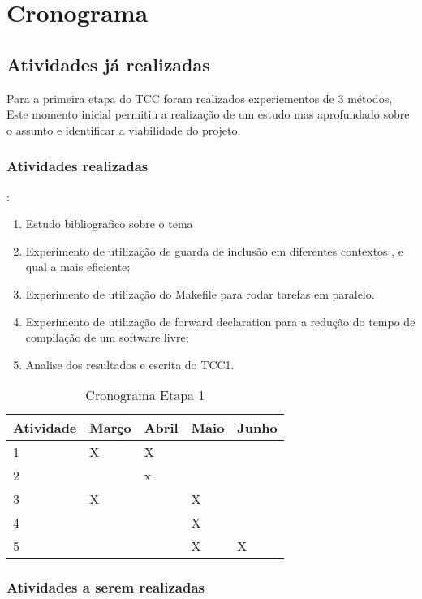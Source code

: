 \chapter[Cronograma]{Cronograma}

\section{Atividades já realizadas}

Para a primeira etapa do TCC foram realizados experiementos de 3 métodos,
 Este momento inicial permitiu a realização de um estudo mas aprofundado
 sobre o assunto e identificar a viabilidade do projeto.


\subsection{Atividades realizadas}:

\begin{enumerate}
	\item		Estudo bibliografico sobre o tema
	\item		Experimento de utilização de guarda de inclusão em diferentes contextos , e qual a mais eficiente;
	\item		Experimento de utilização do Makefile para rodar tarefas em paralelo.
	\item		Experimento de utilização de forward declaration para a redução do tempo de compilação de um software livre;
	\item		Analise dos resultados e escrita do TCC1.
\end{enumerate}

\begin{table}[h]
\centering
\begin{tabular}{|l|l|l|l|l|}
Atividade & Março & Abril & Maio & Junho \\ \hline
1         & X     & X     &      &       \\ \hline
2         &       & x     &      &       \\  \hline
3         & X     &       & X    &       \\ \hline
4         &       &       & X    &       \\ \hline
5         &       &       & X   & X   \\   \hline
\end{tabular} 
\caption{Cronograma Etapa 1}
\label{cronograma1}
\end{table}


\subsection {Atividades a serem realizadas}

